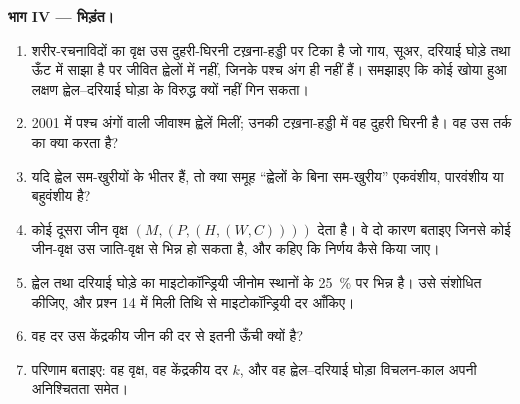 \begin{problem}
\medskip
\noindent\textbf{भाग IV --- भिड़ंत।}
\begin{enumerate}[resume]
  \item शरीर-रचनाविदों का वृक्ष उस दुहरी-घिरनी टख़ना-हड्डी पर टिका है
        जो गाय, सूअर, दरियाई घोड़े तथा ऊँट में साझा है पर जीवित
        ह्वेलों में नहीं, जिनके पश्च अंग ही नहीं हैं। समझाइए कि कोई खोया हुआ
        लक्षण ह्वेल--दरियाई घोड़ा  के विरुद्ध क्यों नहीं गिन सकता।
  \item 2001 में पश्च अंगों वाली जीवाश्म ह्वेलें मिलीं; उनकी
        टख़ना-हड्डी में वह दुहरी घिरनी है। वह उस तर्क का क्या करता है?
  \item यदि ह्वेल सम-खुरीयों के भीतर हैं, तो क्या समूह
        ``ह्वेलों के बिना सम-खुरीय'' एकवंशीय,
        पारवंशीय या बहुवंशीय है?
  \item कोई दूसरा जीन वृक्ष $(M,(P,(H,(W,C))))$ देता है। वे दो
        कारण बताइए जिनसे कोई जीन-वृक्ष उस जाति-वृक्ष से भिन्न हो सकता है, और
        कहिए कि निर्णय कैसे किया जाए।
  \item ह्वेल तथा दरियाई घोड़े का माइटोकॉन्ड्रियी जीनोम स्थानों के
        \qty{25}{\%} पर भिन्न है। उसे संशोधित कीजिए, और प्रश्न 14 में मिली तिथि से
        माइटोकॉन्ड्रियी दर आँकिए।
  \item वह दर उस केंद्रकीय जीन की दर से इतनी ऊँची क्यों है?
  \item परिणाम बताइए: वह वृक्ष, वह केंद्रकीय दर $k$, और वह
        ह्वेल--दरियाई घोड़ा विचलन-काल अपनी अनिश्चितता समेत।
\end{enumerate}
\end{problem}
